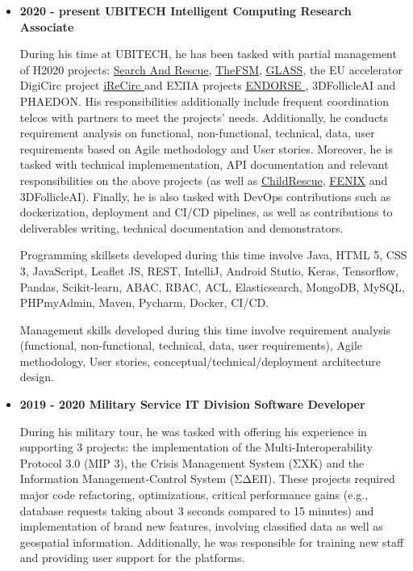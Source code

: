 \documentclass[a4paper,oneside,10pt]{article}
\begin{document}
	\begin{itemize}

		\item \textbf{2020 - present UBITECH Intelligent Computing Research Associate}
		
			During his time at UBITECH, he has been tasked with partial management of H2020 projects: \href{https://cordis.europa.eu/project/id/882897}{Search And Rescue}, \href{https://cordis.europa.eu/project/id/871703}{TheFSM}, \href{https://cordis.europa.eu/project/id/959879}{GLASS}, the EU accelerator DigiCirc project \href{https://digicirc.eu/irecirc/}{iReCirc } and ΕΣΠΑ projects \href{https://endorse.biosim.ntua.gr/}{ENDORSE }, 3DFollicleAI and PHAEDON. His responsibilities additionally include frequent coordination telcos with partners to meet the projects' needs. Additionally, he conducts requirement analysis on functional, non-functional, technical, data, user requirements based on Agile methodology and User stories. Moreover, he is tasked with technical implemementation, API documentation and relevant responsibilities on the above projects (as well as \href{https://cordis.europa.eu/project/id/780938}{ChildRescue}, \href{https://cordis.europa.eu/project/id/760792}{FENIX} and 3DFollicleAI). Finally, he is also tasked with DevOps contributions such as dockerization, deployment and CI/CD pipelines, as well as contributions to deliverables writing, technical documentation and demonstrators.

            Programming skillsets developed during this time involve Java, HTML 5, CSS 3, JavaScript, Leaflet JS, REST, IntelliJ, Android Stutio, Keras, Tensorflow, Pandas, Scikit-learn, ABAC, RBAC, ACL, Elasticsearch, MongoDB, MySQL, PHPmyAdmin, Maven, Pycharm, Docker, CI/CD.
			
			Management skills developed during this time involve requirement analysis (functional, non-functional, technical, data, user requirements), Agile methodology, User stories, conceptual/technical/deployment architecture design.

		\item \textbf{2019 - 2020 Military Service IT Division Software Developer}

			During his military tour, he was tasked with offering his experience in supporting 3 projects: the implementation of the Multi-Interoperability Protocol 3.0 (MIP 3), the Crisis Management System (ΣΧΚ) and the Information Management-Control System (ΣΔΕΠ). These projects required major code refactoring, optimizations, critical performance gains (e.g., database requests taking about 3 seconds compared to 15 minutes) and implementation of brand new features, involving classified data as well as geospatial information. Additionally, he was responsible for training new staff and providing user support for the platforms.


\end{itemize}
\end{document}

